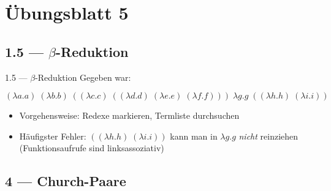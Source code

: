\documentclass{beamer}
\begin{document}
\newcommand{\E}{\;}

\newcommand{\liin}[2]{#1\E{}#2}
\newcommand{\liiin}[3]{#1\E{}#2\E{}#3}
\newcommand{\livn}[4]{#1\E{}#2\E{}#3\E{}#4}
\newcommand{\lvn}[5]{#1\E{}#2\E{}#3\E{}#4\E{}#5}

\newcommand{\lii}[2]{(#1\E{}#2)}
\newcommand{\liii}[3]{(#1\E{}#2\E{}#3)}

\newcommand{\liir}[2]{\textcolor{red}{\underline{(}}#1\E{}#2\textcolor{red}{\underline{)}}}
\newcommand{\liiir}[3]{\textcolor{red}{\underline{(}}#1\E{}#2\E{}#3\textcolor{red}{\underline{)}}}

\newcommand{\subst}[3]{(#1)\left[#2\,\to\,#3\right]}

\newcommand{\abs}[2]{\lambda{}#1.#2}

\section{Übungsblatt 5}

\subsection{1.5 --- $\beta$-Reduktion}


\begin{frame}{1.5 --- $\beta$-Reduktion}
	Gegeben war:

	\begin{equation*}
		\lvn{(\abs{a}{a})}{(\abs{b}{b})}{\lii{(\abs{c}{c})}{\liii{(\abs{d}{d})}{(\abs{e}{e})}{(\abs{f}{f})}}}{\abs{g}{g}}{\lii{(\abs{h}{h})}{(\abs{i}{i})}}
	\end{equation*}

	\begin{itemize}
		\item Vorgehensweise: Redexe markieren, Termliste durchsuchen
		\item Häufigster Fehler: $\lii{(\abs{h}{h})}{(\abs{i}{i})}$ kann man in $\abs{g}{g}$ \emph{nicht} reinziehen (Funktionsaufrufe sind linksassoziativ)
	\end{itemize}
\end{frame}

\subsection{4 --- Church-Paare}

\newcommand{\reducesTo}[1]{\stackrel{#1}{\implies}}
\end{document}
